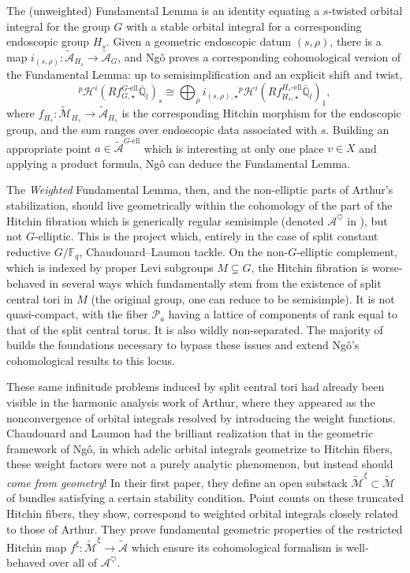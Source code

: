 \documentclass[openany]{amsbook}
\theoremstyle{definition}
\theoremstyle{remark}
\numberwithin{equation}{section}
\newcommand{\Q}{\mathbb{Q}}
\newcommand{\F}{\mathbb{F}}
\newcommand{\cA}{\mathcal{A}}
\newcommand{\cM}{\mathcal{M}}
\newcommand{\cP}{\mathcal{P}}
\newcommand{\ol}[1]{\overline{#1}}
\renewcommand{\-}{\operatorname{-}}
\newcommand{\pHi}{{}^p \mathcal{H}^i}
\newcommand{\el}{\text{-ell}}
\newcommand{\ctM}{\widetilde{\cM}}
\newcommand{\ctA}{\widetilde{\cA}}
\newcommand{\Gell}{G\text{-ell}}
\begin{document}
The (unweighted) Fundamental Lemma is an identity equating a $s$-twisted orbital integral for the group $G$ with a stable orbital integral for a corresponding endoscopic group $H_{s}$. Given a geometric endoscopic datum $(s, \rho)$, there is a map $i_{(s, \rho)} : \ctA_{H_{s}} \longrightarrow \ctA_G$, and Ng\^{o} proves a corresponding cohomological version of the Fundamental Lemma: up to semisimplification and an explicit shift and twist,
$$
    \pHi(R f_{G,\star}^{\Gell} \ol{\Q}_l)_s \cong \bigoplus_{\rho} i_{(s, \rho), \star} \pHi(R f_{H_{s},\star}^{H_{s}\el} \ol{\Q}_l)_1,
$$
where $f_{H_s} : \ctM_{H_s} \to \ctA_{H_s}$ is the corresponding Hitchin morphism for the endoscopic group, and the sum ranges over endoscopic data associated with $s$. Building an appropriate point $a \in \ctA^{\Gell}$ which is interesting at only one place $v \in X$ and applying a product formula, Ng\^{o} can deduce the Fundamental Lemma.

The \emph{Weighted} Fundamental Lemma, then, and the non-elliptic parts of Arthur's stabilization, should live geometrically within the cohomology of the part of the Hitchin fibration which is generically regular semisimple (denoted $\cA^{\heartsuit}$ in \cite{ngofl}), but not $G$-elliptic. This is the project which, entirely in the case of split constant reductive $G/\F_q$, Chaudouard--Laumon tackle. On the non-$G$-elliptic complement, which is indexed by proper Levi subgroups $M \subsetneq G$, the Hitchin fibration is worse-behaved in several ways which fundamentally stem from the existence of split central tori in $M$ (the original group, one can reduce to be semisimple). It is not quasi-compact, with the fiber $\cP_a$ having a lattice of components of rank equal to that of the split central torus. It is also wildly non-separated. The majority of \cite{CLI, CLII} builds the foundations necessary to bypass these issues and extend Ng\^{o}'s cohomological results to this locus. 

These same infinitude problems induced by split central tori had already been visible in the harmonic analysis work of Arthur, where they appeared as the nonconvergence of orbital integrals resolved by introducing the weight functions. Chaudouard and Laumon had the brilliant realization that in the geometric framework of Ng\^{o}, in which adelic orbital integrals geometrize to Hitchin fibers, these weight factors were not a purely analytic phenomenon, but instead should \emph{come from geometry}!
In their first paper, they define an open substack $\ctM^{\xi} \subset \ctM$ of bundles satisfying a certain stability condition. Point counts on these truncated Hitchin fibers, they show, correspond to weighted orbital integrals closely related to those of Arthur. They prove fundamental geometric properties of the restricted Hitchin map $f^{\xi} : \ctM^{\xi} \to \ctA$ which ensure its cohomological formalism is well-behaved over all of $\cA^{\heartsuit}$. 
\end{document}
